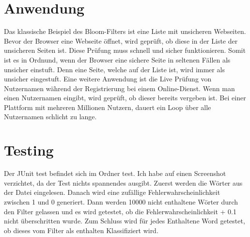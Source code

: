 \documentclass{article}
\begin{document}
    \section{Anwendung}
    Das klassische Beispiel des Bloom-Filters ist eine Liste mit unsicheren Webseiten. Bevor der Browser eine Webseite öffnet, wird geprüft, ob diese in der Liste der unsicheren Seiten ist. Diese Prüfung muss schnell und sicher funktionieren. Somit ist es in Ordnund, wenn der Browser eine sichere Seite in seltenen Fällen als unsicher einstuft. Denn eine Seite, welche auf der Liste ist, wird immer als unsicher eingestuft.
    Eine weitere Anwendung ist die Live Prüfung von Nutzernamen während der Registrierung bei einem Online-Dienst. Wenn man einen Nutzernamen eingibt, wird geprüft, ob dieser bereits vergeben ist. Bei einer Plattform mit mehreren Millionen Nutzern, dauert ein Loop über alle Nutzernamen schlicht zu lange.

    \section{Testing}
    Der JUnit test befindet sich im Ordner test. Ich habe auf einen Screenshot verzichtet, da der Test nichts spannendes ausgibt. Zuerst werden die Wörter aus der Datei eingelesen. Danach wird eine zufällige Fehlerwahrscheinlichkeit zwischen 1 und 0 generiert. Dann werden 10000 nicht enthaltene Wörter durch den Filter gelassen und es wird getestet, ob die Fehlerwahrscheinlichkeit + 0.1 nicht überschritten wurde. Zum Schluss wird für jedes Enthaltene Word getestet, ob dieses vom Filter als enthalten Klassifiziert wird.
\end{document}
